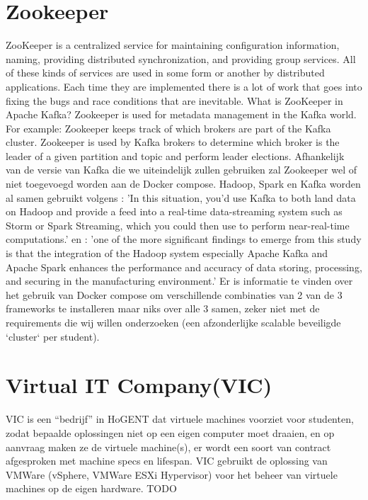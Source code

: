 \section{Zookeeper}
ZooKeeper is a centralized service for maintaining configuration information, naming, providing distributed synchronization, and providing group services. All of these kinds of services are used in some form or another by distributed applications. Each time they are implemented there is a lot of work that goes into fixing the bugs and race conditions that are inevitable.\autocite{ASF2023}
\newline
\newline 
What is ZooKeeper in Apache Kafka?
Zookeeper is used for metadata management in the Kafka world. For example: Zookeeper keeps track of which brokers are part of the Kafka cluster. Zookeeper is used by Kafka brokers to determine which broker is the leader of a given partition and topic and perform leader elections. \autocite{Conduktor2023}
\newline
\newline
Afhankelijk van de versie van Kafka die we uiteindelijk zullen gebruiken zal Zookeeper wel of niet toegevoegd worden aan de Docker compose.
\newline
\newline
\newline
\newline
\newline
Hadoop, Spark en Kafka worden al samen gebruikt volgens \textcite{Holmes2012}:
'In this situation, you'd use Kafka to both land data on Hadoop and provide a feed into a real-time data-streaming system such as Storm or Spark Streaming, which you could then use to perform near-real-time computations.' en \textcite{Leang2019}:
'one of the more significant findings to emerge from this study is that the integration of the Hadoop system especially Apache Kafka and Apache Spark enhances the performance and accuracy of data storing, processing, and securing in the manufacturing environment.'
\newline
\newline
Er is informatie te vinden over het gebruik van Docker compose om verschillende combinaties van 2 van de 3 frameworks te installeren maar niks over alle 3 samen, zeker niet met de requirements die wij willen onderzoeken (een afzonderlijke scalable beveiligde `cluster` per student).



\section{Virtual IT Company(VIC)}
VIC is een ``bedrijf'' in HoGENT dat virtuele machines voorziet voor studenten, zodat bepaalde oplossingen niet op een eigen computer moet draaien, en op aanvraag maken ze de virtuele machine(s), er wordt een soort van contract afgesproken met machine specs en lifespan.
\newline
\newline
VIC gebruikt de oplossing van VMWare (vSphere, VMWare ESXi Hypervisor) voor het beheer van virtuele machines op de eigen hardware.
TODO


